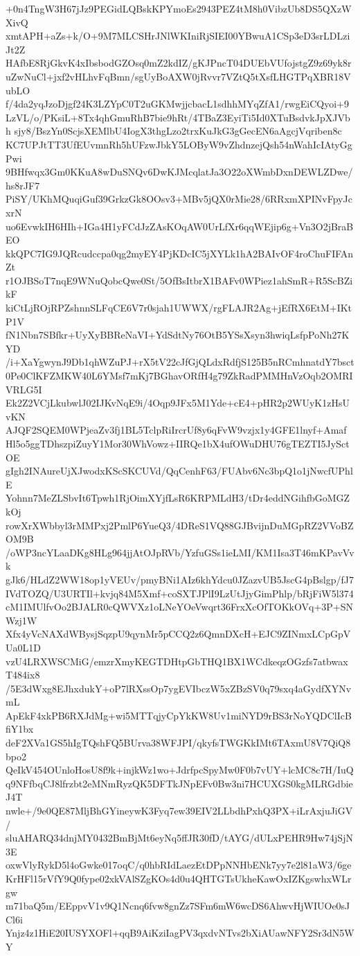 +0n4TngW3H67jJz9PEGidLQBskKPYmoEs2943PEZ4tM8h0VibzUb8DS5QXzWXivQ
xmtAPH+aZs+k/O+9M7MLCSHrJNlWKIniRjSIEI00YBwuA1CSp3eD3srLDLziJt2Z
HAfbE8RjGkvK4xIbsbodGZOsq0mZ2kdIZ/gKJPncT04DUEbVUfojstgZ9z69yk8r
uZwNuCl+jxf2vHLhvFqBmn/sgUyBoAXW0jRvvr7VZtQ5tXsfLHGTPqXBR18VubLO
f/4da2yqJzoDjgf24K3LZYpC0T2uGKMwjjcbacL1sdhhMYqZfA1/rwgEiCQyoi+9
LzVL/o/PKsiL+8Tx4qhGmuRhB7bie9hRt/4TBaZ3EyiTi5Id0XTuBsdvkJpXJVbh
sjy8/BszYn0ScjsXEMlbU4IogX3thgLzo2trxKuJkG3gGecEN6aAgcjVqriben8c
KC7UPJtTT3UfEUvmnRh5hUFzwJbkY5LOByW9vZhdnzejQsh54nWahIcIAtyGgPwi
9BHfwqx3Gm0KKuA8wDuSNQv6DwKJMcqlatJa3O22oXWmbDxnDEWLZDwe/hs8rJF7
PiSY/UKhMQuqiGuf39GrkzGk8OOsv3+MBv5jQX0rMie28/6RRxmXPINvFpyJcxrN
uo6EvwkIH6HIh+IGa4H1yFCdJzZAsKOqAW0UrLfXr6qqWEjip6g+Vn3O2jBraBEO
kkQPC7IG9JQRcudccpa0qg2myEY4PjKDcIC5jXYLk1hA2BAIvOF4roChuFIFAnZt
r1OJBSoT7nqE9WNuQobcQwe0St/5OfBsItbrX1BAFv0WPiez1ahSmR+R5ScBZikF
kiCtLjROjRPZshnnSLFqCE6V7r0sjah1UWWX/rgFLAJR2Ag+jEfRX6EtM+IKtP1V
fN1Nbn7SBfkr+UyXyBBReNaVI+YdSdtNy76OtB5YSsXsyn3hwiqLsfpPoNh27KYD
/i+XaYgwynJ9Db1qhWZuPJ+rX5tV22cJfGjQLdxRdfjS125B5nRCmhnatdY7bsct
0Pe0ClKFZMKW40L6YMsf7mKj7BGhavORfH4g79ZkRadPMMHnVzOqb2OMRIVRLG5I
Ek2Z2VCjLkubwlJ02IJKvNqE9i/4Oqp9JFx5M1Yde+cE4+pHR2p2WUyK1zHsUvKN
AJQF2SQEM0WPjeaZv3fj1BL5TclpRiIrcrUf8y6qFvW9vzjx1y4GFE1lnyf+Amaf
Hl5o5ggTDhszpiZuyY1Mor30WhVowz+IIRQe1bX4ufOWuDHU76gTEZTI5JySctOE
gIgh2INAureUjXJwodxKScSKCUVd/QqCenhF63/FUAbv6Nc3bpQ1o1jNwcfUPhlE
Yohnn7MeZLSbvIt6Tpwh1RjOimXYjfLsR6KRPMLdH3/tDr4eddNGihfbGoMGZkOj
rowXrXWbbyl3rMMPxj2PmlP6YueQ3/4DReS1VQ88GJBvijnDuMGpRZ2VVoBZOM9B
/oWP3ncYLaaDKg8HLg964jjAtOJpRVb/YzfuGSs1ieLMI/KM1Isa3T46mKPavVvk
gJk6/HLdZ2WW18op1yVEUv/pmyBNi1AIz6khYdcu0JZazvUB5JscG4pBslgp/fJ7
IVdTOZQ/U3URTIl+kvjq84M5Xmf+coSXTJPlI9LzUtJjyGimPhlp/bRjFiW5l374
cM1IMUlfvOo2BJALR0cQWVXz1oLNeYOeVwqrt36FrxXcOfTOKkOVq+3P+SNWzj1W
Xfx4yVcNAXdWBysjSqzpU9qynMr5pCCQ2z6QmnDXcH+EJC9ZINmxLCpGpVUa0L1D
vzU4LRXWSCMiG/emzrXmyKEGTDHtpGbTHQ1BX1WCdkeqzOGzfs7atbwaxT484ix8
/5E3dWxg8EJhxdukY+oP7lRXssOp7ygEVIbczW5xZBzSV0q79sxq4aGydfXYNvmL
ApEkF4xkPB6RXJdMg+wi5MTTqjyCpYkKW8Uv1miNYD9rBS3rNoYQDClIcBfiY1bx
deF2XVa1GS5hIgTQshFQ5BUrva38WFJPI/qkyfsTWGKkIMt6TAxmU8V7QiQ8bpo2
QeIkV454OUnloHosU8f9k+injkWz1wo+JdrfpcSpyMw0F0b7vUY+lcMC8c7H/IuQ
q9NFfbqCJ8lfrzbt2eMNmRyzQK5DFTkJNpEFv0Bw3ni7HCUXGS0kgMLRGdbieJ4T
nwle+/9e0QE87MljBhGYineywK3Fyq7ew39EIV2LLbdhPxhQ3PX+iLrAxjuJiGV/
sluAHARQ34dnjMY0432BmBjMt6eyNq5ffJR30fD/tAYG/dULxPEHR9Hw74jSjN3E
oxwVlyRykD5l4oGwke017oqC/q0hbRIdLaezEtDPpNNHbENk7yy7e2l81aW3/6ge
KrHFl15rVfY9Q0fype02xkVAlSZgKOs4d0u4QHTGTsUkheKawOxIZKgswhxWLrgw
m71baQ5m/EEppvV1v9Q1Ncnq6fvw8gnZz7SFm6mW6wcDS6AhwvHjWIUOe0sJCl6i
Ynjz4z1HiE20IUSYXOFl+qqB9AiKziIagPV3qxdvNTvs2bXiAUawNFY2Sr3dN5WY
